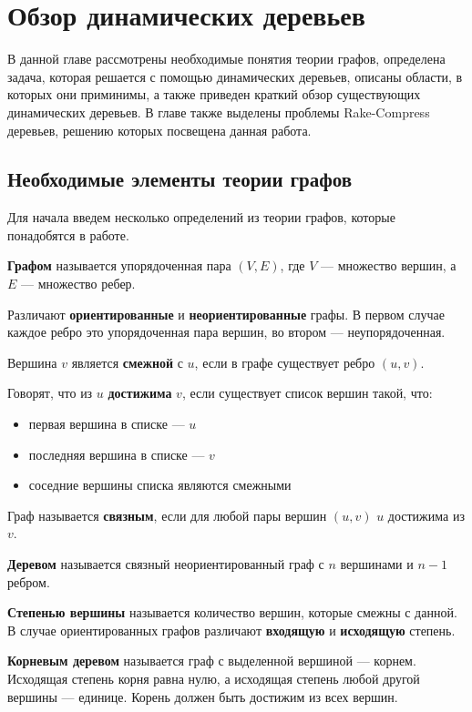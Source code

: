 \chapter{Обзор динамических деревьев}
\label{chapSVD}

В данной главе рассмотрены необходимые понятия теории графов, 
определена задача, которая решается с помощью динамических деревьев, 
описаны области, в которых они приминимы, а также 
приведен краткий обзор существующих динамических деревьев. 
В главе также выделены проблемы Rake-Compress деревьев, решению которых посвещена данная работа.

\section{Необходимые элементы теории графов}

Для начала введем несколько определений из теории графов, которые понадобятся в работе.

{\bf Графом} называется упорядоченная пара $(V, E)$, где $V$ --- множество вершин, а $E$ --- множество ребер.

Различают {\bf ориентированные} и {\bf неориентированные} графы. В первом случае каждое ребро это упорядоченная пара вершин, во втором --- неупорядоченная.

Вершина $v$ является {\bf смежной} с $u$, если в графе существует ребро $(u, v)$.

Говорят, что из $u$ {\bf достижима} $v$, если существует список вершин такой, что:
\begin{itemize}
\item первая вершина в списке --- $u$
\item последняя вершина в списке --- $v$
\item соседние вершины списка являются смежными
\end{itemize}  

Граф называется {\bf связным}, если для любой пары вершин $(u, v)$ $u$ достижима из $v$.

{\bf Деревом} называется связный неориентированный граф с $n$ вершинами и $n - 1$ ребром.

{\bf Степенью вершины} называется количество вершин, которые смежны с данной. В случае ориентированных графов различают {\bf входящую} и {\bf исходящую} степень. 

{\bf Корневым деревом} называется граф с выделенной вершиной --- корнем. Исходящая степень корня равна нулю, а исходящая степень любой другой вершины --- единице. Корень должен быть достижим из всех вершин.

